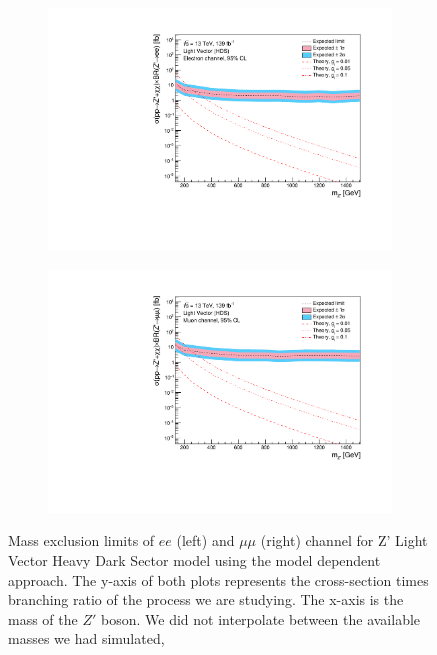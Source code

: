 \documentclass[12pt, a4paper]{book}
\begin{document}
\begin{figure}[!ht]
	\centering
   \begin{subfigure}[b]{0.49\textwidth}
      \centering
      \includegraphics[width=1\textwidth]{Limits/LV_HDS/mass_exclusion_ee.pdf}
      \end{subfigure}
   \hfill
   \begin{subfigure}[b]{0.49\textwidth}
      \centering
      \includegraphics[width=1\textwidth]{Limits/LV_HDS/mass_exclusion_uu.pdf}
      \end{subfigure}
   \caption[Expected mass exclusion limits of $ee$ and $\mu\mu$ channel for all Z' LV HDS model using the model dependent approach]{Mass exclusion limits of $ee$ (left) and $\mu\mu$ (right) channel for Z' Light Vector Heavy Dark Sector model using the model dependent approach. The y-axis of both plots represents the cross-section times branching ratio of the process we are studying. The x-axis is the mass of the $Z'$ boson. We did not interpolate between the available masses we had simulated, 
}
\end{figure}
\end{document}
